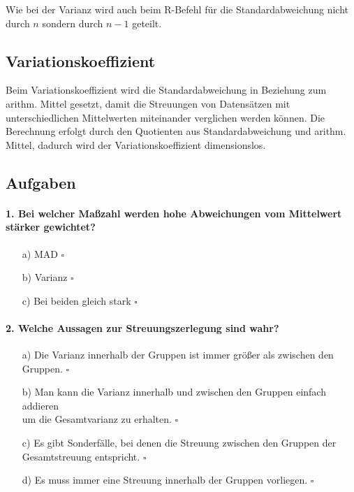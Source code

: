 \documentclass[a4paper]{article}
\newcommand\dangersign{%
 \makebox[1.8em][c]{%
 \makebox[0pt][c]{\raisebox{.15em}{\small!}}%
 \makebox[0pt][c]{\color{red}\Large$\triangle$}}}%
\begin{document}
\noindent \dangersign Wie bei der Varianz wird auch beim R-Befehl für die Standardabweichung nicht durch $n$ sondern durch $n-1$ geteilt.

\subsection{Variationskoeffizient}
Beim Variationskoeffizient wird die Standardabweichung in Beziehung zum arithm. Mittel gesetzt, damit die Streuungen von Datensätzen mit unterschiedlichen Mittelwerten miteinander verglichen werden können. Die Berechnung erfolgt durch den Quotienten aus Standardabweichung und arithm. Mittel, dadurch wird der Variationskoeffizient dimensionslos. \\

\noindent {}

\clearpage

\subsection{Aufgaben}

\paragraph{1. Bei welcher Maßzahl werden hohe Abweichungen vom Mittelwert stärker gewichtet?}

\begin{itemize}
    \item[a)] MAD \hfill $\square$
    \item[b)] Varianz   \hfill $\square$
    \item[c)] Bei beiden gleich stark \hfill $\square$
\end{itemize}

\paragraph{2. Welche Aussagen zur Streuungszerlegung sind wahr?}

\begin{itemize}
    \item[a)] Die Varianz innerhalb der Gruppen ist immer größer als zwischen den Gruppen. \hfill $\square$
    \item[b)] Man kann die Varianz innerhalb und zwischen den Gruppen einfach addieren\\um die Gesamtvarianz zu erhalten. \hfill $\square$
    \item[c)] Es gibt Sonderfälle, bei denen die Streuung zwischen den Gruppen der\\Gesamtstreuung entspricht. \hfill $\square$
    \item[d)] Es muss immer eine Streuung innerhalb der Gruppen vorliegen. \hfill $\square$
\end{itemize}
\end{document}
